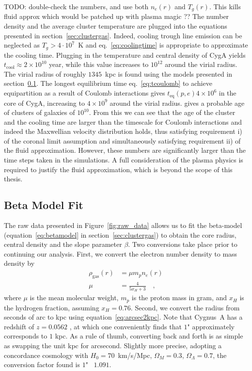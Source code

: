 \documentclass[MScProj_TLRH_ClusterEnergy.tex]{subfiles}
\begin{document}
TODO: double-check the numbers, and use both $n_e(r)$ and $T_g(r)$. This 
kills fluid approx which would be patched up with plasma magic ??
The number density and the average cluster temperature are plugged into the
equations presented in section~\ref{sec:clustergas}. Indeed, cooling trough 
line emission can be neglected as $T_g > 4 \cdot 10^7$~K 
and eq.~\eqref{eq:coolingtime} is appropriate to approximate the cooling time.
Plugging in the temperature and central density of CygA yields $t_{\text{cool}} 
\approx 2 \times 10^{10}$ year, while this value increases to \mytilde $10^{12}$
around the virial radius. The virial radius of roughly $1345$~kpc is found using 
the models presented in section~\ref{sec:results-xray}.
The longest equilibrium time eq.~\eqref{eq:tcoulomb} to achieve equipartition as
a result of Coulomb interactions gives $t_{\text{eq}}(p,e)$\mytilde $4\times 10^6$
in the core of CygA, increasing to \mytilde $4\times 10^9$ around the virial radius.
\citet{1988xrec.book.....S} gives a probable age of clusters of galaxies of $10^{10}$.
From this we can see that the age of the cluster and the cooling time are larger
than the timescale for Coulomb interactions and indeed the Maxwellian velocity 
distribution holds, thus satisfying requirement i) of the coronal limit assumption
and simultaneously satisfying requirement ii) of the fluid approximation. 
However, these numbers are significantly larger than the time steps taken in
the simulations. A full consideration of the plasma physics is required to 
justify the fluid approximation, which is beyond the scope of this thesis.


\subsection{Beta Model Fit}
\label{sec:results-xray}
The raw data presented in Figure~\ref{fig:raw_data} allows us to fit the 
beta-model (equation~\eqref{eq:betamodel} in section~\ref{sec:clustergas}) to
obtain the core radius, central density and the slope parameter $\beta$.
Two conversions take place prior to continuing our analysis. First, we convert
the electron number density to mass density by
\begin{align}
    \rho_{\text{gas}} (r) &= \mu m_p n_e(r) \label{eq:convert-neToRho} \\
    \mu &=  \frac{4}{5 x_H + 3} \quad ,
\end{align}
where $\mu$ is the mean molecular weight, $m_p$ is the proton mass in gram, and
$x_H$ is the hydrogen fraction, assuming $x_H = 0.76$. Second, we convert the 
radius from seconds of arc to kpc using equation~\eqref{eq:arcsec2kpc}.
Note that Cygnus~A has a redshift of $z=0.0562$ \citep{1997ApJ...488L..15O}, 
at which one conveniently finds that $1$" approximately corresponds to $1$ kpc.
As a rule of thumb, converting back and forth is as simple as swapping the unit
kpc for arcsecond. Slightly more precise, adopting a concordance cosmology with
$H_0=70$~km/s/Mpc, $\Omega_M=0.3$, $\Omega_\Lambda=0.7$, the conversion factor
found is $1$" \mytilde \, $1.091$.
\end{document}
